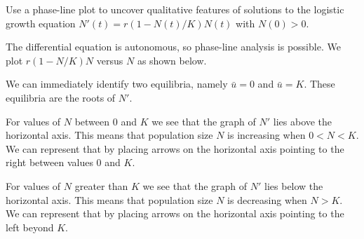 \documentclass[../book.tex]{subfiles}
\begin{document}
\begin{example} \label{eg:phase-line-logistics}
Use a phase-line plot to uncover qualitative features of solutions to the logistic growth equation \(N'(t) = r(1 - N(t)/K)N(t)\) with \(N(0) >0\).
\end{example}

\begin{solution}
The differential equation is autonomous, so phase-line analysis is possible. We plot \(r(1-N/K)N\) versus \(N\) as shown below.
\begin{center}
  \label{fig:inexact-1}
\end{center}
We can immediately identify two equilibria, namely \(\bar u=0\) and \(\bar u=K\). These equilibria are the roots of \(N'\).

For values of \(N\) between \(0\) and \(K\) we see that the graph of \(N'\) lies above the horizontal axis. This means that population size \(N\) is increasing when \(0< N < K\). We can represent that by placing arrows on the horizontal axis pointing to the right between values \(0\) and \(K\).

For values of \(N\) greater than \(K\) we see that the graph of \(N'\) lies below the horizontal axis. This means that population size \(N\) is decreasing when \(N > K\). We can represent that by placing arrows on the horizontal axis pointing to the left beyond \(K\).
\begin{center}
  \label{fig:inexact-2}
\end{center}


\end{solution}
\end{document}
